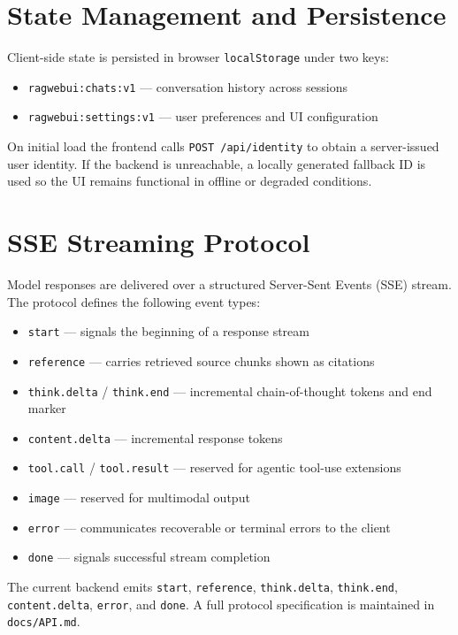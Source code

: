 \section{State Management and Persistence}

Client-side state is persisted in browser \texttt{localStorage} under two keys:

\begin{itemize}
    \item \texttt{ragwebui:chats:v1} — conversation history across sessions
    \item \texttt{ragwebui:settings:v1} — user preferences and UI configuration
\end{itemize}

On initial load the frontend calls \texttt{POST /api/identity} to obtain a server-issued user identity. If the backend is unreachable, a locally generated fallback ID is used so the UI remains functional in offline or degraded conditions.

\section{SSE Streaming Protocol}

Model responses are delivered over a structured Server-Sent Events (SSE) stream. The protocol defines the following event types:

\begin{itemize}
    \item \texttt{start} — signals the beginning of a response stream
    \item \texttt{reference} — carries retrieved source chunks shown as citations
    \item \texttt{think.delta} / \texttt{think.end} — incremental chain-of-thought tokens and end marker
    \item \texttt{content.delta} — incremental response tokens
    \item \texttt{tool.call} / \texttt{tool.result} — reserved for agentic tool-use extensions
    \item \texttt{image} — reserved for multimodal output
    \item \texttt{error} — communicates recoverable or terminal errors to the client
    \item \texttt{done} — signals successful stream completion
\end{itemize}

The current backend emits \texttt{start}, \texttt{reference}, \texttt{think.delta}, \texttt{think.end}, \texttt{content.delta}, \texttt{error}, and \texttt{done}. A full protocol specification is maintained in \texttt{docs/API.md}.
